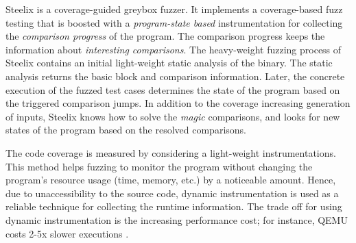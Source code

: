 Steelix \cite{li2017steelix} is a coverage-guided greybox fuzzer. It implements a coverage-based fuzz testing that is boosted with a \textit{program-state based} instrumentation for collecting the \textit{comparison progress} of the program. The comparison progress keeps the information about \textit{interesting comparisons}. The heavy-weight fuzzing process of Steelix contains an initial light-weight static analysis of the binary. The static analysis returns the basic block and comparison information. Later, the concrete execution of the fuzzed test cases determines the state of the program based on the triggered comparison jumps. In addition to the coverage increasing generation of inputs, Steelix knows how to solve the \textit{magic} comparisons, and looks for new states of the program based on the resolved comparisons.

The code coverage is measured by considering a light-weight instrumentations. This method helps fuzzing to monitor the program without changing the program's resource usage (time, memory, etc.) by a noticeable amount. Hence, due to unaccessibility to the source code, dynamic instrumentation is used as a reliable technique for collecting the runtime information. The trade off for using dynamic instrumentation is the increasing performance cost; for instance, QEMU costs 2-5x slower executions \cite{afl_qemu}.

